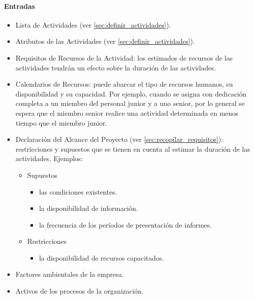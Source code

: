 \documentclass[a4paper,twosides]{article}
\newlength{\wideitemsep}
\let\olditem\item
\renewcommand{\item}{\setlength{\itemsep}{\wideitemsep}\olditem}
\begin{document}
\paragraph{Entradas}
\begin{itemize}
\item Lista de Actividades (ver \ref{sec:definir_actividades}).
\item Atributos de las Actividades (ver \ref{sec:definir_actividades}).
\item Requisitos de Recursos de la Actividad: los estimados de recursos de las actividades tendrán un efecto sobre la duración de las actividades.
\item Calendarios de Recursos: puede abarcar el tipo de recursos humanos, su disponibilidad y su capacidad. Por ejemplo, cuando se asigna con dedicación completa a un miembro del personal junior y a uno senior, por lo general se espera que el miembro senior realice una actividad determinada en menos tiempo que el miembro junior.
\item Declaración del Alcance del Proyecto (ver \ref{sec:recopilar_requisitos}): restricciones y supuestos que se tienen en cuenta al estimar la duración de las actividades. Ejemplos:
\begin{itemize}
\item Supuestos
\begin{itemize}
\item las condiciones existentes.
\item la disponibilidad de información.
\item la frecuencia de los períodos de presentación de informes.
\end{itemize}
\item Restricciones
\begin{itemize}
\item la disponibilidad de recursos capacitados.
\end{itemize}
\end{itemize}
\item Factores ambientales de la empresa.
\item Activos de los procesos de la organización.
\end{itemize}
\end{document}
